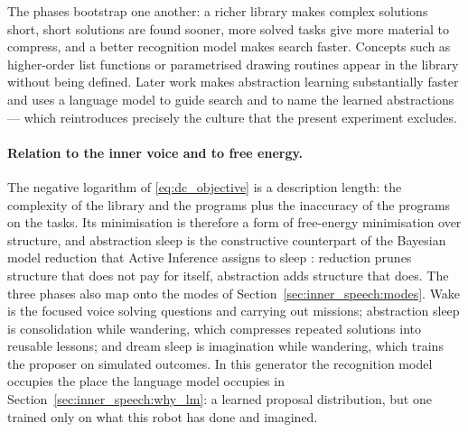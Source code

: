 The phases bootstrap one another: a richer library makes complex solutions short, short solutions are found
sooner, more solved tasks give more material to compress, and a better recognition model makes search faster.
Concepts such as higher-order list functions or parametrised drawing routines appear in the library without being
defined. Later work makes abstraction learning substantially faster \cite{bowers2023stitch} and uses a language
model to guide search and to name the learned abstractions \cite{grand2024lilo} --- which reintroduces precisely the
culture that the present experiment excludes.

\paragraph{Relation to the inner voice and to free energy.}
The negative logarithm of \eqref{eq:dc_objective} is a description length: the complexity of the library and the
programs plus the inaccuracy of the programs on the tasks. Its minimisation is therefore a form of free-energy
minimisation over structure, and abstraction sleep is the constructive counterpart of the Bayesian model reduction
that Active Inference assigns to sleep \cite{friston2017curiosity}: reduction prunes structure that does not pay for
itself, abstraction adds structure that does. The three phases also map onto the modes of
Section~\ref{sec:inner_speech:modes}. Wake is the focused voice solving questions and carrying out missions;
abstraction sleep is consolidation while wandering, which compresses repeated solutions into reusable lessons; and
dream sleep is imagination while wandering, which trains the proposer on simulated outcomes. In this generator the
recognition model occupies the place the language model occupies in Section~\ref{sec:inner_speech:why_lm}: a
learned proposal distribution, but one trained only on what this robot has done and imagined.

